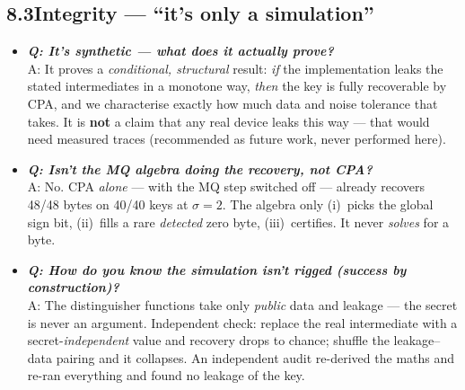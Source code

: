 \documentclass[11pt]{article}
\begin{document}
\subsection*{8.3\quad Integrity --- ``it's only a simulation''}
\begin{itemize}
\item \textbf{\textit{Q: It's synthetic --- what does it actually prove?}}\\
A: It proves a \emph{conditional, structural} result: \emph{if} the implementation leaks the
stated intermediates in a monotone way, \emph{then} the key is fully recoverable by CPA, and we
characterise exactly how much data and noise tolerance that takes. It is \textbf{not} a claim
that any real device leaks this way --- that would need measured traces (recommended as future
work, never performed here).
\item \textbf{\textit{Q: Isn't the MQ algebra doing the recovery, not CPA?}}\\
A: No. CPA \emph{alone} --- with the MQ step switched off --- already recovers 48/48 bytes on
40/40 keys at $\sigma=2$. The algebra only (i)~picks the global sign bit, (ii)~fills a rare
\emph{detected} zero byte, (iii)~certifies. It never \emph{solves} for a byte.
\item \textbf{\textit{Q: How do you know the simulation isn't rigged (success by construction)?}}\\
A: The distinguisher functions take only \emph{public} data and leakage --- the secret is never
an argument. Independent check: replace the real intermediate with a secret-\emph{independent}
value and recovery drops to chance; shuffle the leakage--data pairing and it collapses. An
independent audit re-derived the maths and re-ran everything and found no leakage of the key.
\end{itemize}
\end{document}
